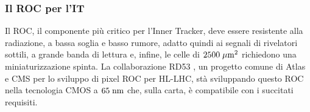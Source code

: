 
\subsubsection{Il ROC per l'IT}

Il ROC, il componente pi\`u critico per l'Inner Tracker, deve essere resistente alla radiazione, a bassa soglia e basso rumore, adatto quindi ai segnali di rivelatori sottili, a grande banda di lettura e, infine, le celle di $2500 \; \mu \rm m^2$ richiedono una miniaturizzazione spinta. La collaborazione RD53 \cite{RD53A}, un progetto comune di Atlas e CMS per lo sviluppo di pixel ROC per HL-LHC,  st\`a sviluppando questo ROC nella tecnologia CMOS a $65\rm \; nm$ che, sulla carta, \`e  compatibile con i succitati requisiti.

